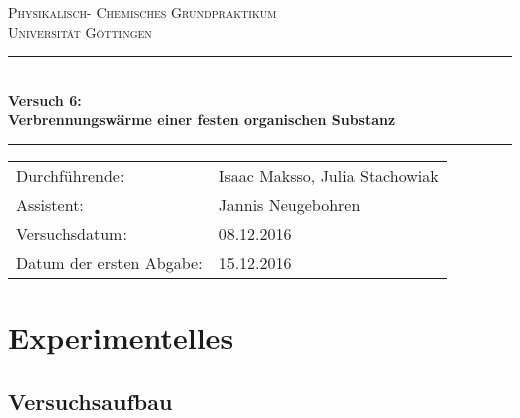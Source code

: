 \documentclass[12pt,a4paper,titlepage,headinclude,bibtotoc]{scrartcl}
\begin{document}
\begin{titlepage}
\centering
\textsc{\Large Physikalisch- Chemisches Grundpraktikum\\[1.5ex] Universität Göttingen}

\vspace*{0.5cm}

\rule{\textwidth}{1pt}\\[0.5cm]
{\huge \bfseries
  Versuch 6: \\[1.5ex]
  Verbrennungswärme einer festen organischen Substanz}\\[0.5cm]
\rule{\textwidth}{1pt}

\vspace*{0.5cm}

\begin{Large}
\begin{tabular}{ll}
Durchführende: &  Isaac Maksso, Julia Stachowiak\\
Assistent: & Jannis Neugebohren\\
Versuchsdatum: & 08.12.2016\\
Datum der ersten Abgabe: & 15.12.2016\\
\end{tabular}
\end{Large}

\vspace*{0.5cm}

\vspace{1.3cm} 
\end{titlepage}


\tableofcontents %
 
 \section{Experimentelles}

\subsection{Versuchsaufbau}
\end{document}
